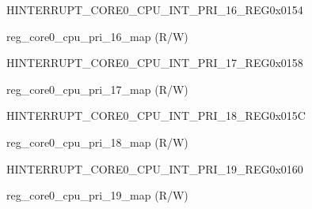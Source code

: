 \begin{register}{H}{INTERRUPT\_CORE0\_CPU\_INT\_PRI\_16\_REG}{0x0154}\label{regdesc:INTERRUPTCORE0CPUINTPRI16REG}
%
%
\regnewline%
\begin{regdesc}\begin{reglist}
\label{fielddesc:INTERRUPTCORE0CPUPRI16MAP}\item [INTERRUPT\_CORE0\_CPU\_PRI\_16\_MAP] reg\_core0\_cpu\_pri\_16\_map (R/W)
\end{reglist}\end{regdesc}
\end{register}


\begin{register}{H}{INTERRUPT\_CORE0\_CPU\_INT\_PRI\_17\_REG}{0x0158}\label{regdesc:INTERRUPTCORE0CPUINTPRI17REG}
%
%
\regnewline%
\begin{regdesc}\begin{reglist}
\label{fielddesc:INTERRUPTCORE0CPUPRI17MAP}\item [INTERRUPT\_CORE0\_CPU\_PRI\_17\_MAP] reg\_core0\_cpu\_pri\_17\_map (R/W)
\end{reglist}\end{regdesc}
\end{register}


\begin{register}{H}{INTERRUPT\_CORE0\_CPU\_INT\_PRI\_18\_REG}{0x015C}\label{regdesc:INTERRUPTCORE0CPUINTPRI18REG}
%
%
\regnewline%
\begin{regdesc}\begin{reglist}
\label{fielddesc:INTERRUPTCORE0CPUPRI18MAP}\item [INTERRUPT\_CORE0\_CPU\_PRI\_18\_MAP] reg\_core0\_cpu\_pri\_18\_map (R/W)
\end{reglist}\end{regdesc}
\end{register}


\begin{register}{H}{INTERRUPT\_CORE0\_CPU\_INT\_PRI\_19\_REG}{0x0160}\label{regdesc:INTERRUPTCORE0CPUINTPRI19REG}
%
%
\regnewline%
\begin{regdesc}\begin{reglist}
\label{fielddesc:INTERRUPTCORE0CPUPRI19MAP}\item [INTERRUPT\_CORE0\_CPU\_PRI\_19\_MAP] reg\_core0\_cpu\_pri\_19\_map (R/W)
\end{reglist}\end{regdesc}
\end{register}


